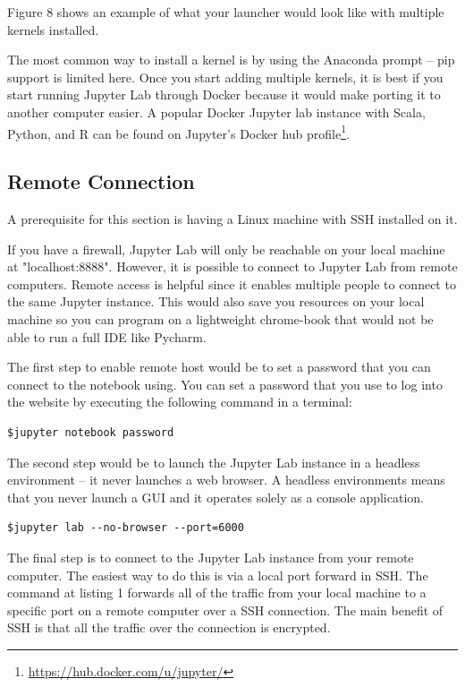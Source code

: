 \documentclass[pdftex,12pt]{artikel3}
\begin{document}
Figure 8 shows an example of what your launcher would look like with multiple kernels installed.

The most common way to install a kernel is by using the Anaconda prompt -- pip support is limited here.
Once you start adding multiple kernels, it is best if you start running Jupyter Lab through Docker because it would make porting it to another computer easier. A popular Docker Jupyter lab instance with Scala, Python, and R can be found on Jupyter's Docker hub profile\footnote{\url{https://hub.docker.com/u/jupyter/}}.

\subsection{Remote Connection}

A prerequisite for this section is having a Linux machine with SSH installed on it. 

If you have a firewall, Jupyter Lab will only be reachable on your local machine at "localhost:8888". 
However, it is possible to connect to Jupyter Lab from remote computers. 
Remote access is helpful since it enables multiple people to connect to the same Jupyter instance. This would also save you resources on your local machine so you can program on a lightweight chrome-book that would not be able to run a full IDE like Pycharm.

The first step to enable remote host would be to set a password that you can connect to the notebook using. You can set a password that you use to log into the website by executing the following command in a terminal:

\begin{lstlisting}
$jupyter notebook password
\end{lstlisting}

The second step would be to launch the Jupyter Lab instance in a headless environment -- it never launches a web browser. 
A headless environments means that you never launch a GUI and it operates solely as a console application. 

\begin{lstlisting}
$jupyter lab --no-browser --port=6000
\end{lstlisting}

The final step is to connect to the Jupyter Lab instance from your
remote computer.
The easiest way to do this is via a local port forward in SSH. 
The command at listing 1 forwards all of the traffic from your local machine to a specific port on a remote computer over a SSH connection.
The main benefit of SSH is that all the traffic over the connection is encrypted.
\end{document}
